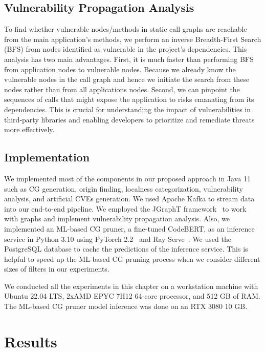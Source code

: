 \subsection{Vulnerability Propagation Analysis}\label{ch2:subsec:vpa}
To find whether vulnerable nodes/methods in static call graphs are reachable from the main application's methods, we perform an inverse Breadth-First Search (BFS) from nodes identified as vulnerable in the project's dependencies. This analysis has two main advantages. First, it is much faster than performing BFS from application nodes to vulnerable nodes. Because we already know the vulnerable nodes in the call graph and hence we initiate the search from these nodes rather than from all applications nodes. Second, we can pinpoint the sequences of calls that might expose the application to risks emanating from its dependencies. This is crucial for understanding the impact of vulnerabilities in third-party libraries and enabling developers to prioritize and remediate threats more effectively.

\subsection{Implementation}
We implemented most of the components in our proposed approach in Java 11 such as CG generation, origin finding, localness categorization, vulnerability analysis, and artificial CVEs generation. We used Apache Kafka to stream data into our end-to-end pipeline. We employed the JGraphT framework~\cite{jgrapht} to work with graphs and implement vulnerability propagation analysis. Also, we implemented an ML-based CG pruner, a fine-tuned CodeBERT, as an inference service in Python 3.10 using PyTorch 2.2~\cite{pt2,paszke2019pytorch} and Ray Serve~\cite{moritz2018ray}. We used the PostgreSQL database to cache the predictions of the inference service. This is helpful to speed up the ML-based CG pruning process when we consider different sizes of filters in our experiments.

We conducted all the experiments in this chapter on a workstation machine with Ubuntu 22.04 LTS, 2xAMD EPYC 7H12 64-core processor, and 512 GB of RAM. The ML-based CG pruner model inference was done on an RTX 3080 10 GB.

\section{Results}
